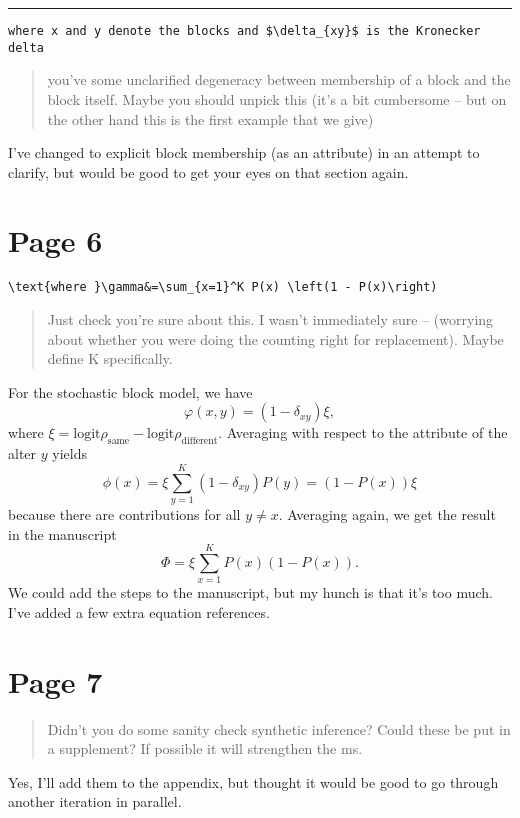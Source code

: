 \documentclass{scrartcl}
\begin{document}
\hrule

\begin{lstlisting}
where x and y denote the blocks and $\delta_{xy}$ is the Kronecker delta
\end{lstlisting}
\begin{quote}
    you've some unclarified degeneracy between membership of a block and the block itself. Maybe you should unpick this (it's a bit cumbersome -- but on the other hand this is the first example that we give)
\end{quote}
I've changed to explicit block membership (as an attribute) in an attempt to clarify, but would be good to get your eyes on that section again.

\section*{Page 6}

\begin{lstlisting}
\text{where }\gamma&=\sum_{x=1}^K P(x) \left(1 - P(x)\right)
\end{lstlisting}
\begin{quote}
    Just check you're sure about this. I wasn't immediately sure -- (worrying about whether you were doing the counting right for replacement). Maybe define K specifically.
\end{quote}
For the stochastic block model, we have
$$
\varphi(x, y) = (1 - \delta_{xy}) \xi,
$$
where $\xi=\mathrm{logit}\rho_\text{same}-\mathrm{logit}\rho_\text{different}$. Averaging with respect to the attribute of the alter $y$ yields
$$
\phi(x) = \xi\sum_{y=1}^K(1 - \delta_{xy}) P(y)=(1- P(x))\xi
$$
because there are contributions for all $y\neq x$. Averaging again, we get the result in the manuscript
$$
\Phi = \xi\sum_{x=1}^K P(x)(1-P(x)).
$$
We could add the steps to the manuscript, but my hunch is that it's too much. I've added a few extra equation references.

\section*{Page 7}

\begin{quote}
    Didn't you do some sanity check synthetic inference? Could these be put in a supplement? If possible it will strengthen the ms.
\end{quote}

Yes, I'll add them to the appendix, but thought it would be good to go through another iteration in parallel.
\end{document}
